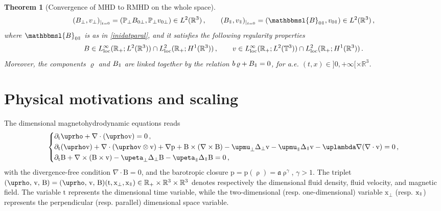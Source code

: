 \documentclass[11pt,reqno]{amsart}
\newtheorem{theorem}{Theorem}
\def \R{{\mathbb{R}}}
\def \T{{\mathbb{T}}}
\def \P{{\mathbb{P}}}
\newcommand{\myparallel}{{\mkern3mu\vphantom{\perp}\vrule depth 0pt\mkern2mu\vrule depth 0pt\mkern3mu}}
\begin{document}
\begin{theorem}[Convergence of MHD to RMHD on the whole space]
  \[
  (B_\perp, v_\perp)_{|_{t=0}} = (\P_\perp B_{0 \perp},\P_\perp v_{0 \perp}) \in L^2(\R^3) \, , \qquad (B_\myparallel, v_\myparallel)_{|_{t=0}} = (
 \mathbbmsl{B}_{0\myparallel}, v_{0 \myparallel}) \in L^2(\R^3) \, ,
  \]
where $ \mathbbmsl{B}_{0\myparallel} $ is as in \eqref{inidatparal}, and it satisfies the following regularity properties
  \[
  B\in L_{\rm loc}^\infty (\R_+; L^2(\R^3)) \cap L_{\rm loc}^2 (\R_+; H^1(\R^3)) \, , \qquad
  v\in L_{\rm loc}^\infty (\R_+; L^2(\T^3)) \cap L_{\rm loc}^2 (\R_+; H^1(\R^3)) \, .
  \]
  Moreover, the components $ \varrho $ and $ B_\myparallel $ are linked together by the relation $ b \, \varrho + B_\myparallel = 0 $, for a.e. $(t,x) \in ]0,+\infty[ \times \R^3$.
  \label{TH-CV-R}
\end{theorem}

\section{Physical motivations and scaling}
\label{s:scaling}
The dimensional magnetohydrodynamic equations reads 
\begin{equation}
\left \{      
\begin{aligned}    
&\partial_{\text{t}} \uprho + \nabla \cdot (\uprho \text{v}) = 0 \,, \\
&\partial_{\text{t}} (\uprho \text{v}) + \nabla \cdot (\uprho \text{v} \otimes \text{v})
  + \nabla \text{p} + \text{B} \times (\nabla \times \text{B} ) 
  - \upmu_\perp \Delta_\perp \text{v} - \upmu_\myparallel\Delta_\myparallel \text{v}
- \uplambda\nabla (\nabla \cdot \text{v}) =0 \,, \\
&\partial_{\text{t}} \text{B} + \nabla \times ( \text{B} \times \text{v})
- \upeta_\perp \Delta_\perp \text{B} - \upeta_\myparallel \Delta_\myparallel \text{B} =0\,,
\end{aligned}
\right.
\label{undim-mhd}
\end{equation}
with the divergence-free condition $\nabla \cdot \text{B}=0$, and the barotropic closure $\text{p}=\text{p}(\uprho)=\mathfrak a \uprho^\gamma$, $\gamma>1$. The triplet $ (\uprho,\, \text{v},\, \text{B})=(\uprho,\, \text{v},\, \text{B})(\text{t},\text{x}_\perp,\text{x}_\myparallel)\in \R_+\times \R^3 \times\R^3$ denotes respectively the dimensional fluid density, fluid velocity, and magnetic field. The variable $\text{t}$ represents the dimensional time variable, while the two-dimensional (resp. one-dimensional) variable $\text{x}_\perp$ (resp. $\text{x}_\myparallel$) represents the perpendicular (resp. parallel) dimensional space variable.
\end{document}
